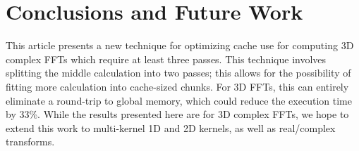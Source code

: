 \documentclass{gtac}
\theoremstyle{problemstyle}
\begin{document}

\section{Conclusions and Future Work}

This article presents a new technique for optimizing cache use for
computing 3D complex FFTs which require at least three passes.  This
technique involves splitting the middle calculation into two passes;
this allows for the possibility of fitting more calculation into
cache-sized chunks.  For 3D FFTs, this can entirely eliminate a
round-trip to global memory, which could reduce the execution time by
33\%.  While the results presented here are for 3D complex FFTs, we
hope to extend this work to multi-kernel 1D and 2D kernels, as well as
real/complex transforms.



\begingroup
\let\itshape\upshape


\endgroup

\end{document}
